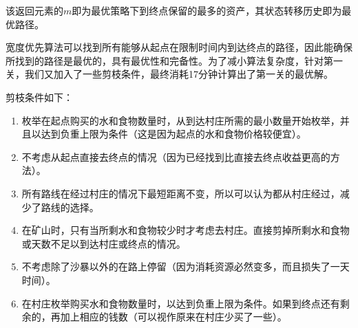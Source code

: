 \documentclass[withoutpreface,bwprint]{cumcmthesis} %
\begin{document}
该返回元素的\(m\)即为最优策略下到终点保留的最多的资产，其状态转移历史即为最优路径。

宽度优先算法可以找到所有能够从起点在限制时间内到达终点的路径，因此能确保所找到的路径是最优的，具有最优性和完备性。为了减小算法复杂度，针对第一关，我们又加入了一些剪枝条件，最终消耗17分钟计算出了第一关的最优解。

剪枝条件如下：
\begin{enumerate}
    \item 枚举在起点购买的水和食物数量时，从到达村庄所需的最小数量开始枚举，并且以达到负重上限为条件（这是因为起点的水和食物价格较便宜）。
    \item 不考虑从起点直接去终点的情况（因为已经找到比直接去终点收益更高的方法）。
    \item 所有路线在经过村庄的情况下最短距离不变，所以可以认为都从村庄经过，减少了路线的选择。
    \item 在矿山时，只有当所剩水和食物较少时才考虑去村庄。直接剪掉所剩水和食物或天数不足以到达村庄或终点的情况。
    \item 不考虑除了沙暴以外的在路上停留（因为消耗资源必然变多，而且损失了一天时间）。
    \item 在村庄枚举购买水和食物数量时，以达到负重上限为条件。如果到终点还有剩余的，再加上相应的钱数（可以视作原来在村庄少买了一些）。
\end{enumerate}
\end{document}

